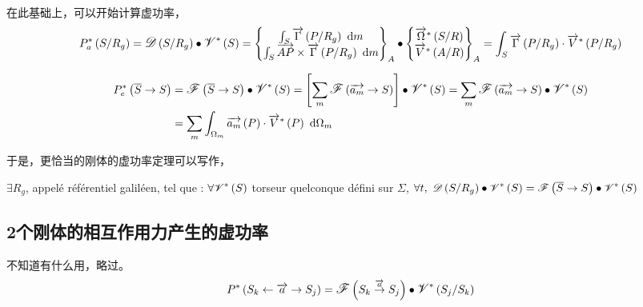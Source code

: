 \documentclass[UTF8]{ctexart}%
\begin{document}
在此基础上，可以开始计算虚功率，
\begin{equation}
	P_a^{\ast}\left(S/R_g\right)=\mathlarger{\mathscr{D}}\left(S/R_g\right)\bullet \mathlarger{\mathscr{V}}^{\ast}\left(S\right)=\left\{\begin{matrix}
  \int_{S}\overrightarrow{\Gamma}\left(P/R_g\right)\ \mathrm{d}m \\
  \int_{S}\overrightarrow{AP}\times\overrightarrow{\Gamma}\left(P/R_g\right)\ \mathrm{d}m
 \end{matrix} \right\}_A \bullet \left\{\begin{matrix}
  \overrightarrow{\Omega}^{\ast}\left(S/R\right) \\
  \overrightarrow{V}^{\ast}\left(A/R\right)
 \end{matrix} \right\}_A=\int_{S} \overrightarrow{\Gamma}\left(P/R_g\right)\cdot \overrightarrow{V}^{\ast}\left(P/R_g\right)
\end{equation}


\begin{align}
	P_e^{\ast}\left(\overline{S}\rightarrow S\right)&=\mathlarger{\mathscr{F}}\left(\overline{S}\rightarrow S\right)\bullet\mathlarger{\mathscr{V}}^{\ast}\left(S\right)=\left[\sum_{m}\mathlarger{\mathscr{F}}\left(\overrightarrow{a_m}\rightarrow S\right)\right]\bullet\mathlarger{\mathscr{V}}^{\ast}\left(S\right)=\sum_{m}\mathlarger{\mathscr{F}}\left(\overrightarrow{a_m}\rightarrow S\right)\bullet\mathlarger{\mathscr{V}}^{\ast}\left(S\right)\notag \\
	&=\sum_{m}\int_{\Omega_m}\overrightarrow{a_m}\left(P\right)\cdot\overrightarrow{V}^{\ast}\left(P\right)\ \mathrm{d}\Omega_m
\end{align}

于是，更恰当的刚体的虚功率定理可以写作，

$\exists R_g$, appelé référentiel galiléen, tel que : $\forall \mathlarger{\mathscr{V}}^{\ast}\left(S\right)$ torseur quelconque défini sur $\Sigma$, $\forall t,\ \mathlarger{\mathscr{D}}\left(S/R_g\right)\bullet \mathlarger{\mathscr{V}}^{\ast}\left(S\right)=\mathlarger{\mathscr{F}}\left(\overline{S}\rightarrow S\right)\bullet\mathlarger{\mathscr{V}}^{\ast}\left(S\right)$


\subsection{2个刚体的相互作用力产生的虚功率}
\label{sec:2个刚体的相互作用力产生的虚功率}
不知道有什么用，略过。
\begin{equation}
	P^{\ast}\left(S_k\leftarrow \overrightarrow{a} \rightarrow S_j\right)=\mathlarger{\mathscr{F}}\left(S_k \stackrel{\overrightarrow{a}}{\rightarrow} S_j\right)\bullet \mathlarger{\mathscr{V}}^{\ast}\left(S_j/S_k\right)
\end{equation}
\end{document}
